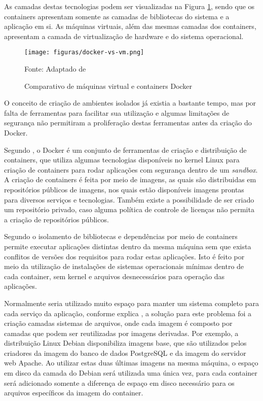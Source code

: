 As camadas destas tecnologias podem ser visualizadas na Figura
\ref{fig:docker-vs-vm}, sendo que os containers apresentam somente as camadas
de bibliotecas do sistema e a aplicação em si. As máquinas virtuais, além das
mesmas camadas dos containers, apresentam a camada de virtualização de
hardware e do sistema operacional.

\begin{figure}[H]
	\centering
	\caption{Comparativo de máquinas virtual e containers Docker}
	\texttt{[image: figuras/docker-vs-vm.png]}

	\label{fig:docker-vs-vm}
	\footnotesize Fonte: Adaptado de 
\end{figure}

O conceito de criação de ambientes isolados já existia a bastante tempo, mas
por falta de ferramentas para facilitar sua utilização e algumas limitações
de segurança não permitiram a proliferação destas ferramentas antes da criação
do Docker.

Segundo , o Docker é um conjunto de ferramentas de
criação e distribuição de containers, que utiliza algumas tecnologias
disponíveis no kernel Linux para criação de containers para rodar aplicações
com segurança dentro de um \emph{sandbox}. A criação de containers é feita por
meio de imagens, as quais são distribuidas em repositórios públicos de imagens,
nos quais estão disponíveis imagens prontas para diversos serviços e
tecnologias. Também existe a possibilidade de ser criado um repositório
privado, caso alguma política de controle de licenças não permita a criação
de repositórios públicos.

Segundo  o isolamento de bibliotecas e dependências por
meio de containers permite executar aplicações distintas dentro da mesma
máquina sem que exista conflitos de versões dos requisitos para rodar estas
aplicações. Isto é feito por meio da utilização de instalações de sistemas
operacionais mínimas dentro de cada container, sem kernel e arquivos
desnecessários para operação das aplicações.

Normalmente seria utilizado muito espaço para manter um sistema completo para
cada serviço da aplicação, conforme explica , a
solução para este problema foi a criação camadas sistemas de arquivos, onde
cada imagem é composto por camadas que podem ser reutilizadas por imagens
derivadas. Por exemplo, a distribuição Linux Debian disponibiliza imagens
base, que são utilizados pelos criadores da imagem do banco de dados
PostgreSQL e da imagem do servidor web Apache. Ao utilizar estas duas últimas
imagens na mesma máquina, o espaço em disco da camada do Debian será utilizada
uma única vez, para cada container será adicionado somente a diferença de
espaço em disco necessário para os arquivos específicos da imagem do container.

